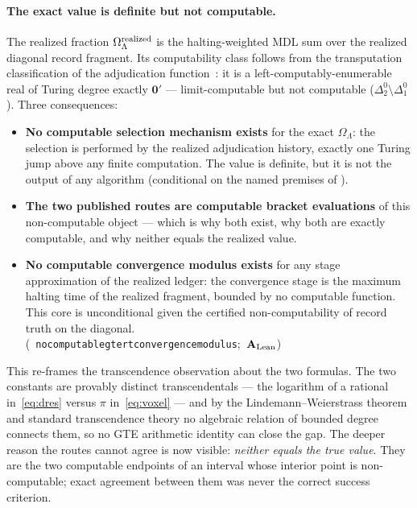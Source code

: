 \documentclass[11pt]{article}
\theoremstyle{remark}
\newcommand{\lean}[1]{%
  \penalty-100
  \begingroup\def\_{\textunderscore\allowbreak}\texttt{#1}\endgroup}
\newcommand{\OmL}{\Omega_\Lambda}
\newcommand{\CatAL}{\ensuremath{\textbf{A}_{\rm Lean}}}
\begin{document}
\paragraph{The exact value is definite but not computable.}
The realized fraction $\OmL^{\rm realized}$ is the halting-weighted MDL sum
over the realized diagonal record fragment. Its computability class follows
from the transputation classification of the adjudication
function~\cite{SpivackPolynomialTransputation}: it is a left-computably-enumerable
real of Turing degree exactly $\mathbf{0}'$ --- limit-computable but not
computable ($\Delta_2^0\setminus\Delta_1^0$). Three consequences:
\begin{itemize}[noitemsep,topsep=2pt]
  \item \textbf{No computable selection mechanism exists} for the exact
        $\OmL$: the selection is performed by the realized adjudication
        history, exactly one Turing jump above any finite computation. The
        value is definite, but it is not the output of any algorithm
        (conditional on the named premises of ).
  \item \textbf{The two published routes are computable bracket evaluations}
        of this non-computable object --- which is why both exist, why both
        are exactly computable, and why neither equals the realized value.
  \item \textbf{No computable convergence modulus exists} for any stage
        approximation of the realized ledger: the convergence stage is the
        maximum halting time of the realized fragment, bounded by no
        computable function. This core is unconditional given the certified
        non-computability of record truth on the diagonal.\\
        \mbox{(\lean{no\_computable\_gte\_rt\_convergence\_modulus}; \CatAL)}
\end{itemize}
This re-frames the transcendence observation about the two formulas. The two
constants are provably distinct transcendentals --- the logarithm of a rational
in~\eqref{eq:dres} versus $\pi$ in~\eqref{eq:voxel} --- and by the
Lindemann--Weierstrass theorem and standard transcendence theory no algebraic
relation of bounded degree connects them, so no GTE arithmetic identity can
close the gap. The deeper reason the routes cannot agree is now visible:
\emph{neither equals the true value}. They are the two computable endpoints of
an interval whose interior point is non-computable; exact agreement between
them was never the correct success criterion.
\end{document}
